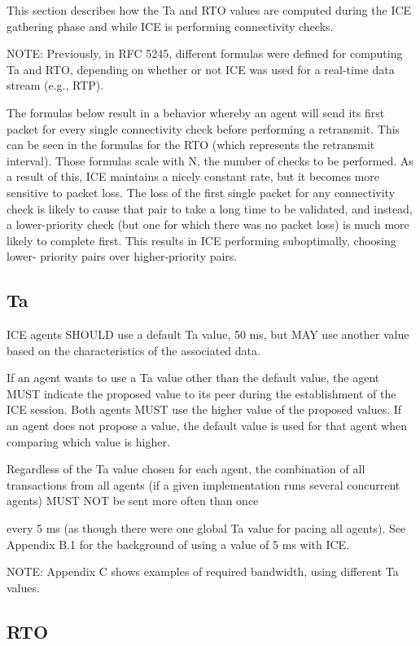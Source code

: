 \documentclass{article}
\begin{document}
This section describes how the Ta and RTO values are computed during the ICE gathering phase and while ICE is performing connectivity checks.

NOTE: Previously, in RFC 5245, different formulas were defined for computing Ta and RTO, depending on whether or not ICE was used for a real-time data stream (e.g., RTP).

The formulas below result in a behavior whereby an agent will send its first packet for every single connectivity check before performing a retransmit.  This can be seen in the formulas for the RTO (which represents the retransmit interval).  Those formulas scale with N, the number of checks to be performed.  As a result of this, ICE maintains a nicely constant rate, but it becomes more sensitive to packet loss.  The loss of the first single packet for any connectivity check is likely to cause that pair to take a long time to be validated, and instead, a lower-priority check (but one for which there was no packet loss) is much more likely to complete first.  This results in ICE performing suboptimally, choosing lower- priority pairs over higher-priority pairs.

\subsection{Ta}

ICE agents SHOULD use a default Ta value, 50 ms, but MAY use another value based on the characteristics of the associated data.

If an agent wants to use a Ta value other than the default value, the agent MUST indicate the proposed value to its peer during the establishment of the ICE session.  Both agents MUST use the higher value of the proposed values.  If an agent does not propose a value, the default value is used for that agent when comparing which value is higher.

Regardless of the Ta value chosen for each agent, the combination of all transactions from all agents (if a given implementation runs several concurrent agents) MUST NOT be sent more often than once

every 5 ms (as though there were one global Ta value for pacing all agents).  See Appendix B.1 for the background of using a value of 5 ms with ICE.

NOTE: Appendix C shows examples of required bandwidth, using different Ta values.

\subsection{RTO}
\end{document}
